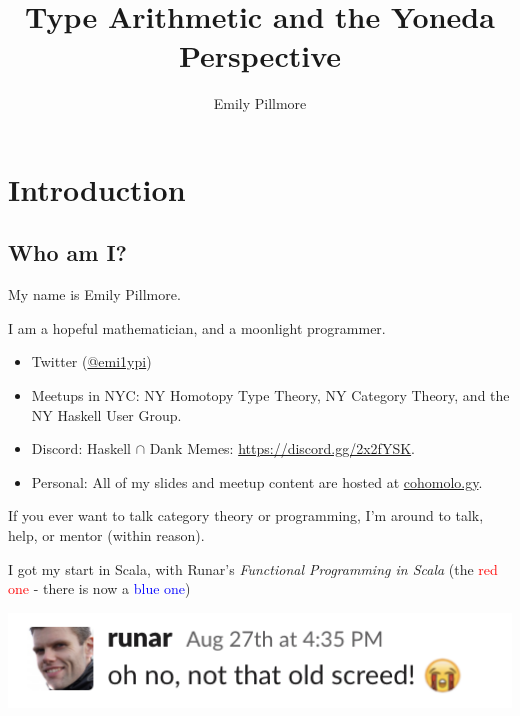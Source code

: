 \documentclass[tikz]{beamer}
\title{Type Arithmetic and the Yoneda Perspective}
\author{Emily Pillmore}
\theoremstyle{definition}
\begin{document}
\frame{\titlepage}

\section[Outline]{}
\frame{\tableofcontents[hideallsubsections]}

\section{Introduction}
\subsection{Who am I?}

\frame
{
	My name is Emily Pillmore.
	
	I am a hopeful mathematician, and a moonlight programmer.
}

\frame
{
	\begin{itemize}
		\item Twitter (\href{https://twitter.com/emi1ypi}{@emi1ypi})
		\item Meetups in NYC: NY Homotopy Type Theory, NY Category Theory, and the NY Haskell User Group. 
		\item Discord: Haskell $\cap$ Dank Memes: \href{https://discord.gg/2x2fYSK}{https://discord.gg/2x2fYSK}. 
		\item Personal: All of my slides and meetup content are hosted at \href{https://github.com/cohomolo-gy}{cohomolo.gy}.
	\end{itemize}
	
	
	If you ever want to talk category theory or programming, I'm around to talk, help, or mentor (within reason).
}

\frame
{
	I got my start in Scala, with Runar's \textit{Functional Programming in Scala} (the \textcolor{red}{red one} - there is now a \textcolor{blue}{blue one})
	
}

\frame
{
	\begin{center}
		\includegraphics[scale=0.7]{screed}
	\end{center}
}
\end{document}
